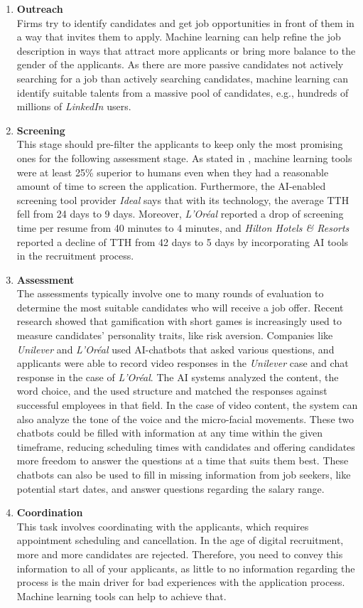 \documentclass[draft,final]{thesisclass} %
\begin{document}
\begin{enumerate}
    \item \textbf{Outreach}\\
    Firms try to identify candidates and get job opportunities in front of them in a way that invites them to apply. Machine learning can help refine the job description in ways that attract more applicants or bring more balance to the gender of the applicants. As there are more passive candidates not actively searching for a job than actively searching candidates, machine learning can identify suitable talents from a massive pool of candidates, e.g., hundreds of millions of \textit{LinkedIn} users.
    \item \textbf{Screening}\\
    This stage should pre-filter the applicants to keep only the most promising ones for the following assessment stage.
    As stated in \textcite[6]{ai_recruiting}, machine learning tools were at least 25\% superior to humans even when they had a reasonable amount of time to screen the application. Furthermore, the \acs{AI}-enabled screening tool provider \textit{Ideal} says that with its technology, the average \gls{TTH} fell from 24 days to 9 days.
    Moreover, \textit{L'Oréal} reported a drop of screening time per resume from 40 minutes to 4 minutes, and \textit{Hilton Hotels \& Resorts} reported a decline of \gls{TTH} from 42 days to 5 days by incorporating \acs{AI} tools in the recruitment process.
    \item \textbf{Assessment}\\
    The assessments typically involve one to many rounds of evaluation to determine the most suitable candidates who will receive a job offer. Recent research showed that gamification with short games is increasingly used to measure candidates' personality traits, like risk aversion. Companies like \textit{Unilever} and \textit{L'Oréal} used \acs{AI}-chatbots that asked various questions, and applicants were able to record video responses in the \textit{Unilever} case and chat response in the case of \textit{L'Oréal}. The \acs{AI} systems analyzed the content, the word choice, and the used structure and matched the responses against successful employees in that field. In the case of video content, the system can also analyze the tone of the voice and the micro-facial movements. These two chatbots could be filled with information at any time within the given timeframe, reducing scheduling times with candidates and offering candidates more freedom to answer the questions at a time that suits them best. These chatbots can also be used to fill in missing information from job seekers, like potential start dates, and answer questions regarding the salary range.
    \item \textbf{Coordination}\\
    This task involves coordinating with the applicants, which requires appointment scheduling and cancellation. In the age of digital recruitment, more and more candidates are rejected. Therefore, you need to convey this information to all of your applicants, as little to no information regarding the process is the main driver for bad experiences with the application process. Machine learning tools can help to achieve that.
\end{enumerate}
\end{document}
